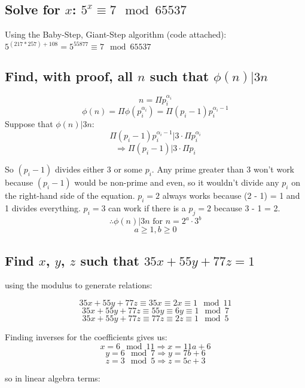 \documentclass[]{article}
\begin{document}
\subsection{Solve for $x$: $5^x \equiv 7 \mod 65537$}
Using the Baby-Step, Giant-Step algorithm (code attached): $5^{(217 * 257) + 108} = 5^{55877} \equiv 7 \mod 65537$
\subsection{Find, with proof, all $n$ such that $\phi(n)|3n$}
$$n = \Pi p_i ^{\alpha_i}$$
$$\phi(n) = \Pi \phi(p_i^{\alpha_i})  = \Pi (p_i - 1)p_i^{\alpha_i - 1}$$
Suppose that $\phi(n) | 3n$:
$$\Pi (p_i - 1)p_i^{\alpha_i - 1} | 3 \cdot \Pi p_i ^{\alpha_i}$$
$$\Rightarrow \Pi (p_i - 1) | 3 \cdot \Pi p_i$$

So $(p_i - 1)$ divides either 3 or some $p_i$.  Any prime greater than 3 won't work because $(p_i - 1)$ would be non-prime and even, so it wouldn't divide any $p_i$ on the right-hand side of the equation.  $p_i = 2$ always works because (2 - 1) = 1 and 1 divides everything.  $p_i = 3$ can work if there is a $p_j = 2$ because 3 - 1 = 2.
$$\therefore \phi(n) | 3n \text{ for } n = 2^a \cdot 3^b$$
$$a \ge 1, b \ge 0$$

\subsection{Find $x$, $y$, $z$ such that $35x + 55y + 77z = 1$}
using the modulus to generate relations:

$$35x + 55y + 77z \equiv 35x \equiv 2x \equiv 1 \mod 11$$
$$35x + 55y + 77z \equiv 55y \equiv 6y \equiv 1 \mod 7$$
$$35x + 55y + 77z \equiv 77z \equiv 2z \equiv 1 \mod 5$$

Finding inverses for the coefficients gives us:
$$x = 6 \mod 11 \Rightarrow x = 11a + 6$$
$$y = 6 \mod 7 \Rightarrow y = 7b + 6$$
$$z = 3 \mod 5 \Rightarrow z = 5c + 3$$

so in linear algebra terms:
\end{document}
